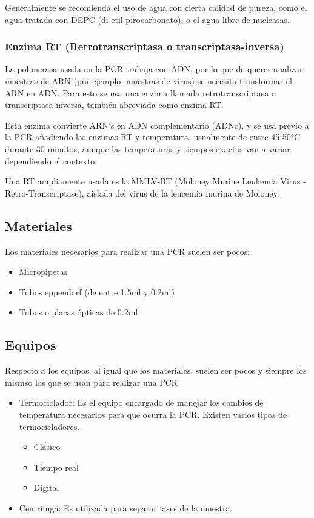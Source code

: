 Generalmente se recomienda el uso de agua con cierta calidad de pureza, como el agua tratada con DEPC (di-etil-pirocarbonato), o el agua libre de nucleasas.

\subsubsection{Enzima RT (Retrotranscriptasa o transcriptasa-inversa)}

La polimerasa usada en la PCR trabaja con ADN, por lo que de querer analizar muestras de ARN (por ejemplo, muestras de virus) se necesita transformar el ARN en ADN. Para esto se usa una enzima llamada retrotranscriptasa o transcriptasa inversa, también abreviada como enzima RT.

Esta enzima convierte ARN's en ADN complementario (ADNc), y se usa previo a la PCR añadiendo las enzimas RT y temperatura, usualmente de entre 45-50°C durante 30 minutos, aunque las temperaturas y tiempos exactos van a variar dependiendo el contexto.

Una RT ampliamente usada es la MMLV-RT (Moloney Murine Leukemia Virus - Retro-Transcriptase), aislada del virus de la leucemia murina de Moloney.

\subsection{Materiales}

Los materiales necesarios para realizar una PCR suelen ser pocos:

\begin{itemize}
    \item Micropipetas
    \item Tubos eppendorf (de entre 1.5ml y 0.2ml)
    \item Tubos o placas ópticas de 0.2ml
\end{itemize}

\subsection{Equipos}

Respecto a los equipos, al igual que los materiales, suelen ser pocos y siempre los mismso los que se usan para realizar una PCR

\begin{itemize}
    \item Termociclador: Es el equipo encargado de manejar los cambios de temperatura necesarios para que ocurra la PCR. Existen varios tipos de termocicladores.
        \begin{itemize}
            \item Clásico
            \item Tiempo real
            \item Digital
        \end{itemize}
    
    \item Centrífuga: Es utilizada para separar fases de la muestra.  
\end{itemize}

